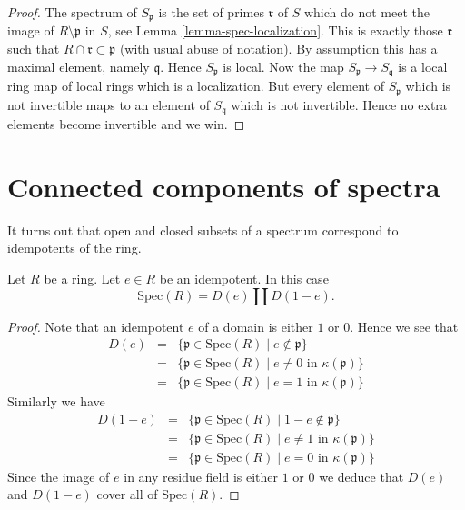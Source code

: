 \begin{proof}
The spectrum of $S_{\mathfrak p}$ is the set of primes $\mathfrak r$ of $S$
which do not meet the image of $R \setminus \mathfrak p$ in $S$, see
Lemma \ref{lemma-spec-localization}. This is exactly those $\mathfrak r$
such that $R \cap \mathfrak r \subset \mathfrak p$
(with usual abuse of notation). By assumption this has a maximal
element, namely $\mathfrak q$. Hence $S_{\mathfrak p}$ is local.
Now the map $S_{\mathfrak p} \to S_{\mathfrak q}$ is a local ring
map of local rings which is a localization. But every element of
$S_{\mathfrak p}$ which is not invertible maps to an element of
$S_{\mathfrak q}$ which is not invertible. Hence no extra elements
become invertible and we win.
\end{proof}

\section{Connected components of spectra}
\label{section-connected-components}

\noindent
It turns out that open and closed subsets of a spectrum correspond to
idempotents of the ring.

\begin{lemma}
\label{lemma-idempotent-spec}
Let $R$ be a ring. Let $e \in R$ be an idempotent.
In this case
$$
\text{Spec}(R) = D(e) \coprod D(1-e).
$$
\end{lemma}

\begin{proof}
Note that an idempotent $e$ of a domain is either $1$ or $0$.
Hence we see that
\begin{eqnarray*}
D(e)
& = &
\{ \mathfrak p \in \text{Spec}(R)
\mid
e \not\in \mathfrak p \} \\
& = &
\{ \mathfrak p \in \text{Spec}(R)
\mid
e \not= 0\text{ in }\kappa(\mathfrak p) \} \\
& = &
\{ \mathfrak p \in \text{Spec}(R)
\mid
e = 1\text{ in }\kappa(\mathfrak p) \}
\end{eqnarray*}
Similarly we have
\begin{eqnarray*}
D(1-e)
& = &
\{ \mathfrak p \in \text{Spec}(R)
\mid
1 - e \not\in \mathfrak p \} \\
& = &
\{ \mathfrak p \in \text{Spec}(R)
\mid
e \not= 1\text{ in }\kappa(\mathfrak p) \} \\
& = &
\{ \mathfrak p \in \text{Spec}(R)
\mid
e = 0\text{ in }\kappa(\mathfrak p) \}
\end{eqnarray*}
Since the image of $e$ in any residue field is either $1$ or $0$
we deduce that $D(e)$ and $D(1-e)$ cover all of $\text{Spec}(R)$.
\end{proof}

